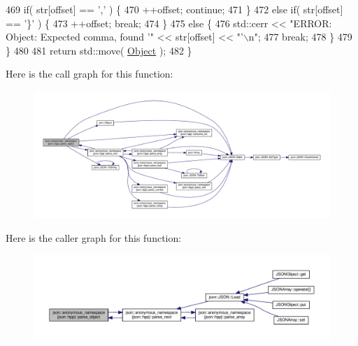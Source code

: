 \begin{DoxyCode}
469             \textcolor{keywordflow}{if}( str[offset] == \textcolor{charliteral}{','} ) \{
470                 ++offset; \textcolor{keywordflow}{continue};
471             \}
472             \textcolor{keywordflow}{else} \textcolor{keywordflow}{if}( str[offset] == \textcolor{charliteral}{'\}'} ) \{
473                 ++offset; \textcolor{keywordflow}{break};
474             \}
475             \textcolor{keywordflow}{else} \{
476                 std::cerr << \textcolor{stringliteral}{"ERROR: Object: Expected comma, found '"} << str[offset] << \textcolor{stringliteral}{"'\(\backslash\)n"};
477                 \textcolor{keywordflow}{break};
478             \}
479         \}
480 
481         \textcolor{keywordflow}{return} std::move( \mbox{\hyperlink{namespacejson_a7bc7d25f21c18a652a42db29cfdabd06}{Object}} );
482     \}
\end{DoxyCode}
Here is the call graph for this function\+:
\nopagebreak
\begin{figure}[H]
\begin{center}
\leavevmode
\includegraphics[width=350pt]{namespacejson_1_1anonymous__namespace_02json_8hpp_03_a69b6c8f8bb93130f5c6dab832000f915_cgraph}
\end{center}
\end{figure}
Here is the caller graph for this function\+:
\nopagebreak
\begin{figure}[H]
\begin{center}
\leavevmode
\includegraphics[width=350pt]{namespacejson_1_1anonymous__namespace_02json_8hpp_03_a69b6c8f8bb93130f5c6dab832000f915_icgraph}
\end{center}
\end{figure}
\mbox{\label{namespacejson_1_1anonymous__namespace_02json_8hpp_03_a274c7a1f9001093d6b093abb5481122b}} 
